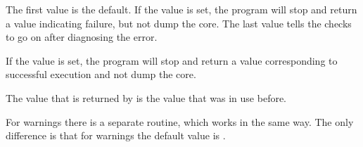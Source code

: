 The first value is the default. 
If the  value is set, the program will stop and return a value 
indicating failure, but not dump the core. 
The last value tells the checks to go on after diagnosing the error.

\begin{ccAdvanced}
If the  value is set, the program will stop and 
return a value corresponding to successful execution and not dump the core. 
\end{ccAdvanced}

The value that is returned by  is the value that 
was in use before.

For warnings there is a separate routine, which works in the same way.
The only difference is that for warnings the default value is
.

\ccGlueBegin
{}
\ccGlueEnd

%


